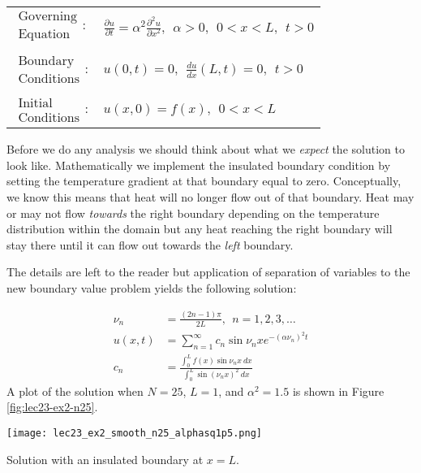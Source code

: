 \begin{table}
\begin{tabular}{l l}
$\substack{\text{Governing} \\\text{Equation}}: $& $\frac{\partial u}{\partial t} = \alpha^2 \frac{\partial^2 u}{\partial x^2}, \ \ \alpha>0, \ \ 0<x<L, \ \ t>0$ \\
& \\
$\substack{\text{Boundary} \\ \text{Conditions}}: $& $u(0,t)=0, \ \ \frac{du}{dx}(L,t) = 0, \ \ t>0$\\
& \\
$\substack{\text{Initial} \\ \text{Conditions}}: $ & $u(x,0) = f(x), \ \ 0<x<L $ \\
\end{tabular}
\end{table}

\vspace{0.25cm}

\noindent Before we do any analysis we should think about what we \emph{expect} the solution to look like.  Mathematically we implement the insulated boundary condition by setting the temperature gradient at that boundary equal to zero.  Conceptually, we know this means that heat will no longer flow out of that boundary.  Heat may or may not flow \emph{towards} the right boundary depending on the temperature distribution within the domain but any heat reaching the right boundary will stay there until it can flow out towards the \emph{left} boundary.

\vspace{0.25cm}
\noindent The details are left to the reader but application of separation of variables to the new boundary value problem yields the following solution:

\begin{align*}
\nu_n &= \frac{(2n-1)\pi}{2L}, \ \ n=1,2,3,\dots \\
u(x,t) &= \sum\limits_{n=1}^{\infty} c_n \sin{\nu_n x}e^{-(\alpha \nu_n)^2 t} \\
c_n &= \frac{\int_0^L f(x) \sin{\nu_n x} \ dx}{\int_0^L \sin{(\nu_n x)}^2 \ dx}
\end{align*}
A plot of the solution when $N=25$, $L=1$, and $\alpha^2=1.5$ is shown in Figure \ref{fig:lec23-ex2-n25}.

\begin{marginfigure}
\texttt{[image: lec23\_ex2\_smooth\_n25\_alphasq1p5.png]}
\caption{Solution with an insulated boundary at $x=L$.}
\label{fig:lec23-ex2-n25}
\end{marginfigure}
